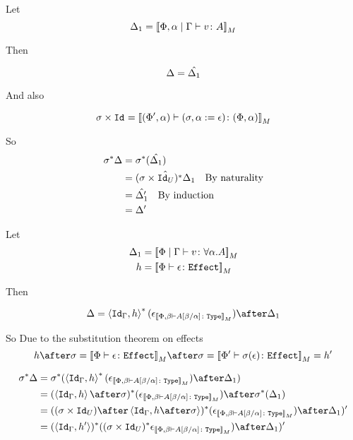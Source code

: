 \documentclass{report}
\newcommand\type[0]{\texttt{Type}}
\newcommand\effect[0]{\texttt{Effect}}
\renewcommand\star[0]{^*}
\begin{document}

Let \begin{equation}
    \Delta_1 = {\bf [\![}\Phi,\alpha\mid\Gamma \vdash v \colon A{\bf ]\!]}_M
\end{equation}

Then

\begin{equation}
    \Delta = \hat{\Delta_1}\\
\end{equation}

And also

\begin{equation}
    \sigma\times\texttt{Id}_{} = {\bf [\![}(\Phi',\alpha) \vdash (\sigma, \alpha:=\epsilon) \colon (\Phi,\alpha){\bf ]\!]}_M
\end{equation}

So
\begin{align}
    \si\star\D &= \si\star(\hat{\D_1})\\
    & = \hat{(\si\times\Id{U})\star\D_1}\qt{By naturality}\\
    & = \hat{\D_1'}\qt{By induction}\\
    & = \D'
\end{align}


Let \begin{align}
    \D_1 &= \deno{\gpetyperelation{v}{\all{\a}{A}}}\\
    h &= \deno{\typerelation{\P}{\e}{\effect}}\\
\end{align}

Then

\begin{equation}
    \D = \pr{\Id{\G}}{h}\star(\e_{\deno{\typerelation{\P,\b}{A\ssub{\a}{\b}}{\type}}})\after\D_1\\
\end{equation}

So
Due to the substitution theorem on effects
\begin{equation}
    h\after\si = \deno{\typerelation{\P}{\e}{\effect}}\after\si = \deno{\typerelation{\P'}{\si(\e)}{\effect}} = h'
\end{equation}

\begin{align}
    \si\star{\D} & = \si\star(\pr{\Id{\G}}{h}\star(\e_{\deno{\typerelation{\P,\b}{A\ssub{\a}{\b}}{\type}}})\after\D_1)\\
    & = (\pr{\Id{\G}}{h}\after\si)\star(\e_{\deno{\typerelation{\P,\b}{A\ssub{\a}{\b}}{\type}}})\after\si\star(\D_1)\\
    & = ((\si\times\Id{U})\after\pr{\Id{\G}}{h\after\si})\star(\e_{\deno{\typerelation{\P,\b}{A\ssub{\a}{\b}}{\type}}})\after\D_1)'\\
    & = (\pr{\Id{\G}}{h'})\star((\si\times\Id{U})\star\e_{\deno{\typerelation{\P,\b}{A\ssub{\a}{\b}}{\type}}})\after\D_1)'\\
\end{align}
\end{document}
